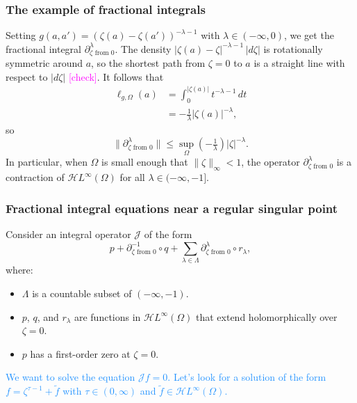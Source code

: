 \documentclass{article}
\theoremstyle{plain}
\newcommand{\holoL}[1]{\mathcal{H}L^{#1}} %
\begin{document}
\subsubsection{The example of fractional integrals}
Setting $g(a, a') = (\zeta(a) - \zeta(a'))^{-\lambda-1}$ with $\lambda \in (-\infty, 0)$, we get the fractional integral $\partial^\lambda_{\zeta \text{ from } 0}$. The density $|\zeta(a) - \zeta|^{-\lambda-1}\,|d\zeta|$ is rotationally symmetric around $a$, so the shortest path from $\zeta = 0$ to $a$ is a straight line with respect to $|d\zeta|$ \textcolor{magenta}{[check]}. It follows that
\begin{align*}
\ell_{g, \Omega}(a) & = \int_0^{|\zeta(a)|} t^{-\lambda-1}\,dt \\
& = -\tfrac{1}{\lambda} |\zeta(a)|^{-\lambda},
\end{align*}
so
\[ \|\partial^\lambda_{\zeta \text{ from } 0}\| \le \sup_\Omega {(-\tfrac{1}{\lambda}) |\zeta|^{-\lambda}}. \]
In particular, when $\Omega$ is small enough that $\|\zeta\|_\infty < 1$, the operator $\partial^\lambda_{\zeta \text{ from } 0}$ is a contraction of $\holoL{\infty}(\Omega)$ for all $\lambda \in (-\infty, -1]$.
\subsubsection{Fractional integral equations near a regular singular point}
Consider an integral operator $\mathcal{J}$ of the form
\[ p + \partial^{-1}_{\zeta \text{ from } 0} \circ q + \sum_{\lambda \in \Lambda} \partial^\lambda_{\zeta \text{ from } 0} \circ r_\lambda, \]
where:
\begin{itemize}
\item $\Lambda$ is a countable subset of $(-\infty, -1)$.
\item $p$, $q$, and $r_\lambda$ are functions in $\holoL{\infty}(\Omega)$ that extend holomorphically over $\zeta = 0$.
\item $p$ has a first-order zero at $\zeta = 0$.
\end{itemize}

\textcolor{DodgerBlue}{We want to solve the equation $\mathcal{J}f = 0$. Let's look for a solution of the form $f = \zeta^{\tau-1} + \tilde{f}$ with $\tau \in (0, \infty)$ and $\tilde{f} \in \holoL{\infty}(\Omega)$.}
\end{document}
